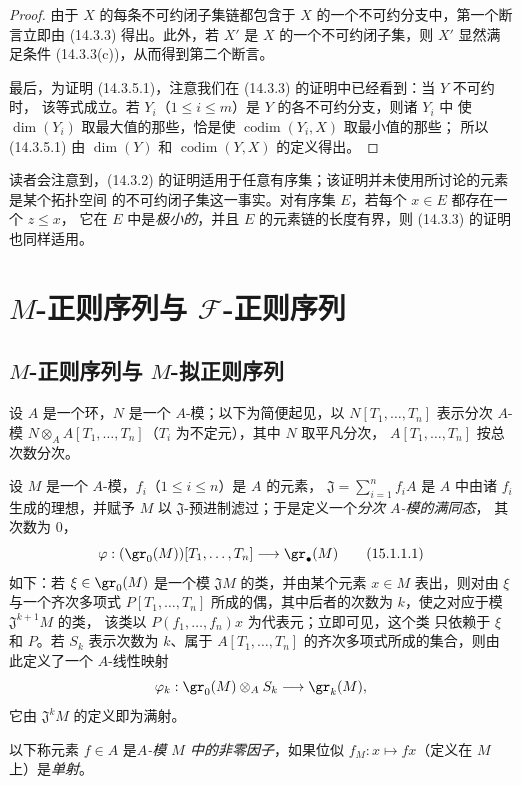 \begin{proof}
由于 $X$ 的每条不可约闭子集链都包含于 $X$ 的一个不可约分支中，第一个断言立即由
(14.3.3) 得出。此外，若 $X'$ 是 $X$ 的一个不可约闭子集，则 $X'$ 显然满足条件
(14.3.3(c))，从而得到第二个断言。

最后，为证明 (14.3.5.1)，注意我们在 (14.3.3) 的证明中已经看到：当 $Y$ 不可约时，
该等式成立。若 $Y_i$（$1\leq i\leq m$）是 $Y$ 的各不可约分支，则诸 $Y_i$ 中
使 $\dim(Y_i)$ 取最大值的那些，恰是使 $\operatorname{codim}(Y_i,X)$ 取最小值的那些；
所以 (14.3.5.1) 由 $\dim(Y)$ 和 $\operatorname{codim}(Y,X)$ 的定义得出。
\end{proof}

\begin{remark}[14.3.6]
\label{0.14.3.6-fr}
读者会注意到，(14.3.2) 的证明适用于任意有序集；该证明并未使用所讨论的元素是某个拓扑空间
的不可约闭子集这一事实。对有序集 $E$，若每个 $x\in E$ 都存在一个 $z\leq x$，
它在 $E$ 中是\emph{极小的}，并且 $E$ 的元素链的长度有界，则 (14.3.3) 的证明也同样适用。
\end{remark}

\section{\texorpdfstring{$M$}{M}-正则序列与
\texorpdfstring{$\mathscr F$}{F}-正则序列}
\label{section:0.15-fr}

\subsection{\texorpdfstring{$M$}{M}-正则序列与
\texorpdfstring{$M$}{M}-拟正则序列}
\label{subsection:0.15.1-fr}
\label{0.15.1-fr}

\begin{env}[15.1.1]
\label{0.15.1.1-fr}
设 $A$ 是一个环，$N$ 是一个 $A$-模；以下为简便起见，以
$N[T_1,\ldots,T_n]$ 表示分次 $A$-模
$N\otimes_A A[T_1,\ldots,T_n]$（$T_i$ 为不定元），其中 $N$ 取平凡分次，
$A[T_1,\ldots,T_n]$ 按总次数分次。

设 $M$ 是一个 $A$-模，$f_i$（$1\leq i\leq n$）是 $A$ 的元素，
$\mathfrak{J}=\sum_{i=1}^n f_iA$ 是 $A$ 中由诸 $f_i$ 生成的理想，并赋予
$M$ 以 $\mathfrak{J}$-预进制滤过；于是定义一个\emph{分次 $A$-模的满同态}，
其次数为 $0$，
\[
  \varphi : (\gr_0(M))[T_1,\ldots,T_n]\longrightarrow\gr_\bullet(M)
  \tag{15.1.1.1}\label{0.15.1.1.1-fr}
\]
如下：若 $\xi\in\gr_0(M)$ 是一个模 $\mathfrak{J}M$ 的类，并由某个元素
$x\in M$ 表出，则对由 $\xi$ 与一个齐次多项式 $P[T_1,\ldots,T_n]$
所成的偶，其中后者的次数为 $k$，使之对应于模 $\mathfrak{J}^{k+1}M$ 的类，
该类以 $P(f_1,\ldots,f_n)x$ 为代表元；立即可见，这个类
只依赖于 $\xi$ 和 $P$。若 $S_k$ 表示次数为 $k$、属于
$A[T_1,\ldots,T_n]$ 的齐次多项式所成的集合，则由此定义了一个 $A$-线性映射
\[
  \varphi_k:\gr_0(M)\otimes_A S_k\longrightarrow\gr_k(M),
\]
它由 $\mathfrak{J}^kM$ 的定义即为满射。

以下称元素 $f\in A$ 是\emph{$A$-模 $M$ 中的非零因子}，如果位似
$f_M:x\mapsto fx$（定义在 $M$ 上）是\emph{单射}。
\end{env}

